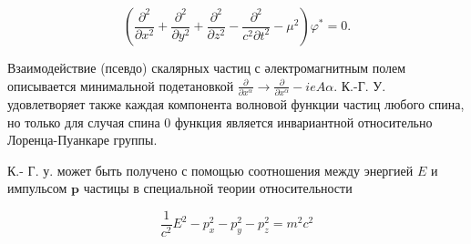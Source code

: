 \documentclass[10pt]{article}
\begin{document}
\[

\left(\frac{\partial^{2}}{\partial x^{2}}+\frac{\partial^{2}}{\partial y^{2}}+\frac{\partial^{2}}{\partial z^{2}}-\frac{\partial^{2}}{c^{2} \partial t^{2}}-\mu^{2}\right) \varphi^{*}=0 .

\]



Взаимодействие (псевдо) скалярных частиц с әлектромагнитным полем описывается минимальной подетановкой $\frac{\partial}{\partial x^{\alpha}} \rightarrow \frac{\partial}{\partial x^{\alpha}}-i e A \alpha$. К.-Г. У. удовлетворяет также каждая компонента волновой функции частиц любого спина, но только для случая спина 0 функция является инвариантной относительно Лоренца-Пуанкаре группы.



К.- Г. у. может быть получено с помощью соотношения между энергией $E$ и импульсом $\boldsymbol{p}$ частицы в специальной теории относительности



\[

\frac{1}{c^{2}} E^{2}-p_{x}^{2}-p_{y}^{2}-p_{z}^{2}=m^{2} c^{2}

\]
\end{document}
